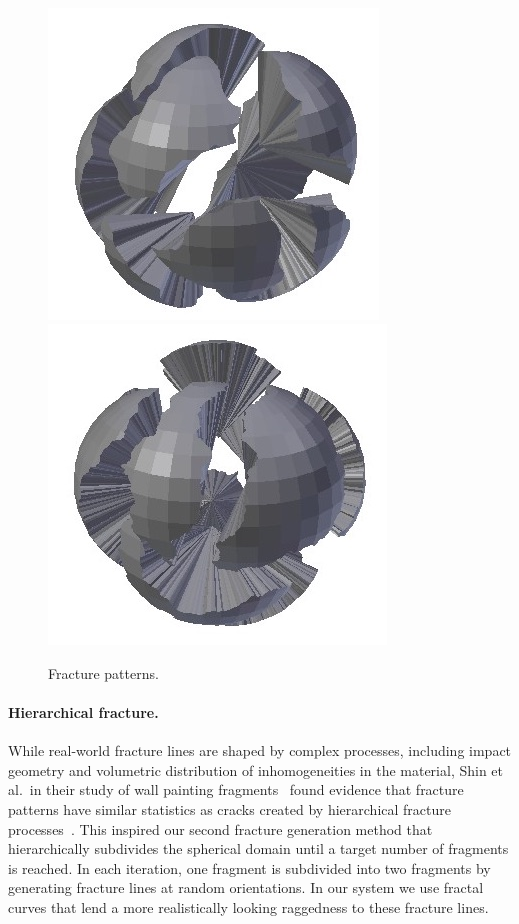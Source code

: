\documentclass[acmlarge,screen,dvipsnames]{acmart}
\begin{document}
\begin{figure}[htb]
  \hspace{0.2in}\\
  \strut\hfill%
  {\includegraphics[width=0.30\linewidth]{images/fracturehighamplitude}}%
  \hspace{0.2in}%
  {\includegraphics[width=0.30\linewidth]{images/fracturehighestamplitude}}%
  \hspace*{0.1in}%
  \caption{\label{fig:fracture-type-examples}%
    Fracture patterns\vspace*{-1\baselineskip}.}
\end{figure}

\paragraph{Hierarchical fracture.}
%
While real-world fracture lines are shaped by complex processes,
including impact geometry and volumetric distribution of
inhomogeneities in the material, Shin et al.\ in their study of wall
painting fragments~\cite{Shin:2012:ASF:2362402.2362404} found evidence
that fracture patterns have similar statistics as cracks created by
hierarchical fracture processes~\cite{Bohn:2005:Four}.
%
This inspired our second fracture generation method that
hierarchically subdivides the spherical domain until a target number
of fragments is reached. In each iteration, one fragment is subdivided
into two fragments by generating fracture lines at random
orientations.
%
In our system we use fractal curves that lend a more realistically
looking raggedness to these fracture lines.
\end{document}

